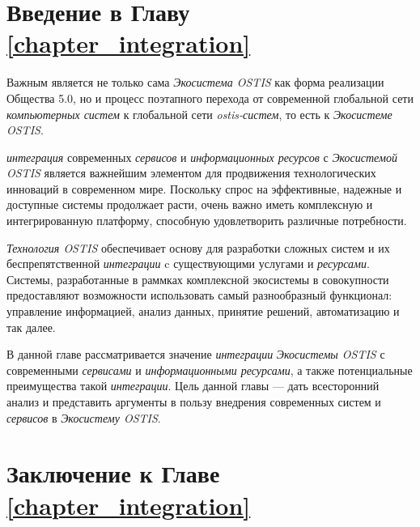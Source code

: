 \section*{Введение в Главу \ref{chapter_integration}}
Важным является не только сама \textit{Экосистема OSTIS} как форма реализации Общества 5.0, но и процесс поэтапного перехода от современной глобальной сети \textit{компьютерных систем} к глобальной сети \textit{ostis-систем}, то есть к \textit{Экосистеме OSTIS}.

\textit{интеграция} современных \textit{сервисов} и \textit{информационных ресурсов} с \textit{Экосистемой OSTIS} является важнейшим элементом для продвижения технологических инноваций в современном мире. Поскольку спрос на эффективные, надежные и доступные системы продолжает расти, очень важно иметь комплексную и интегрированную платформу, способную удовлетворить различные потребности.

\textit{Технология OSTIS} обеспечивает основу для разработки сложных систем и их беспрепятственной \textit{интеграции} c существующими услугами и \textit{ресурсами}. Системы, разработанные в раммках комплексной экосистемы в совокупности предоставляют возможности использовать самый разнообразный функционал: управление информацией, анализ данных, принятие решений, автоматизацию и так далее.

В данной главе рассматривается значение \textit{интеграции} \textit{Экосистемы OSTIS} с современными \textit{сервисами} и \textit{информационными ресурсами}, а также потенциальные преимущества такой \textit{интеграции}. 
Цель данной главы --- дать всесторонний анализ и представить аргументы в пользу внедрения современных систем и \textit{сервисов} в \textit{Экосистему OSTIS}.




%
\section*{Заключение к Главе \ref{chapter_integration}}

